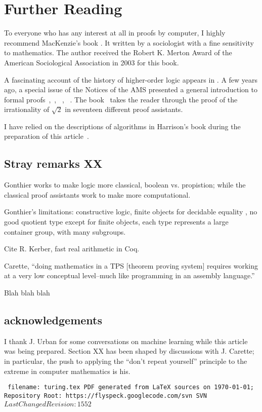 \documentclass{llncs}
\def\svninfo{{\tt
  filename: turing.tex\hfill\break
  PDF generated from LaTeX sources on \today; \hfill\break
  Repository Root: https://flyspeck.googlecode.com/svn \hfill\break
  SVN $LastChangedRevision: 1552 $
  }
  }
\begin{document}
\section{Further Reading}

To everyone who has any interest at all in proofs by computer, I
highly recommend MacKenzie's book \cite{Mac}.  It written by a
sociologist with a fine sensitivity to mathematics.  The author
received the Robert K. Merton Award of the American Sociological
Association in 2003 for this book.

A fascinating account of the history of higher-order logic appears in
\cite{Gor}.  A few years ago, a special issue of the Notices of the
AMS presented a general introduction to formal
proofs~\cite{Hales:2008:formal},~\cite{Harrison:2008:formal},
~\cite{gonthier:2008:formal}, ~\cite{Wiedijk:2008:formal}.  The
book~\cite{wiedijk:17} takes the reader through the proof of the
irrationality of $\sqrt2$ in seventeen different proof assistants.

I have relied on the descriptions of algorithms in
Harrison's book during the preparation of this article~\cite{Ha09}.


\subsection{Stray remarks XX}

Gonthier works to make logic more classical, boolean vs. propistion;
while the classical proof assistants work to make more computational.

Gonthier's limitations: constructive logic, finite objects for
decidable equality , no good quotient type except for finite objects,
each type represents a large container group, with many subgroups.

Cite R. Kerber, fast real arithmetic in Coq.

Carette, ``doing mathematics in a TPS [theorem proving system]
requires working at a very low
conceptual level--much like programming in an assembly language.''


\bigskip
Blah blah blah





\subsection{acknowledgements}

I thank J. Urban for some conversations on machine learning while this
article was being prepared. Section XX has been shaped by
discussions with J. Carette; in particular, the push to applying the
``don't repeat yourself'' principle to the extreme in computer mathematics is
his.

\raggedright



\bigskip
\noindent
\svninfo
\end{document}
